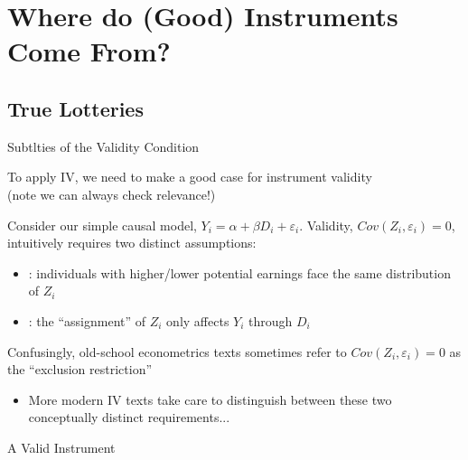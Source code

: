 \documentclass{beamer}
\begin{document}

\section{Where do (Good) Instruments Come From?}

\subsection{True Lotteries}
\begin{frame}{Subtlties of the Validity Condition}

To apply IV, we need to make a good case for instrument validity \\ (note we can always check relevance!)\pause
\medskip

Consider our simple causal model, $Y_i=\alpha+\beta D_i+\varepsilon_i$. Validity, $Cov(Z_i,\varepsilon_i)=0$, intuitively requires two distinct assumptions:\pause
\begin{itemize}
  \item {}: individuals with higher/lower potential earnings face the same distribution of $Z_i$
  \item {}: the ``assignment'' of $Z_i$ only affects $Y_i$ through $D_i$
\end{itemize}
\medskip\pause

Confusingly, old-school econometrics texts sometimes refer to $Cov(Z_i,\varepsilon_i)=0$ as the ``exclusion restriction''
\pause
\begin{itemize}
  \item More modern IV texts take care to distinguish between these two conceptually distinct requirements... 
\end{itemize}

\end{frame}

\begin{frame}{A Valid Instrument}
  \begin{adjustbox}{width = 0.7\textwidth, center}
  \end{adjustbox}
\end{frame}
\end{document}

